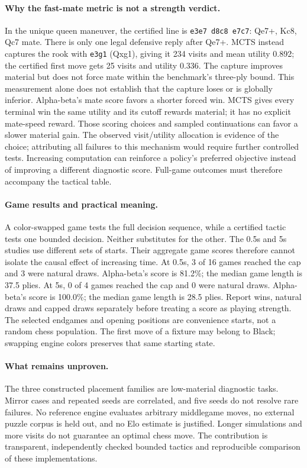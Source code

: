 \paragraph{Why the fast-mate metric is not a strength verdict.}
In the unique queen maneuver, the certified line is \texttt{e3e7 d8c8 e7c7}: Qe7+, Kc8, Qc7 mate. There is only one legal defensive reply after Qe7+.
MCTS instead captures the rook with \texttt{e3g1} (Qxg1), giving it 234 visits and mean utility 0.892; the certified first move gets 25 visits and utility 0.336.
The capture improves material but does not force mate within the benchmark's three-ply bound. This measurement alone does not establish that the capture loses or is globally inferior.
Alpha-beta's mate score favors a shorter forced win. MCTS gives every terminal win the same utility and its cutoff rewards material; it has no explicit mate-speed reward.
Those scoring choices and sampled continuations can favor a slower material gain. The observed visit/utility allocation is evidence of the choice; attributing all failures to this mechanism would require further controlled tests.
Increasing computation can reinforce a policy's preferred objective instead of improving a different diagnostic score. Full-game outcomes must therefore accompany the tactical table.
\paragraph{Game results and practical meaning.}
A color-swapped game tests the full decision sequence, while a certified tactic tests one bounded decision. Neither substitutes for the other.
The 0.5s and 5s studies use different sets of starts. Their aggregate game scores therefore cannot isolate the causal effect of increasing time.
At 0.5s, 3 of 16 games reached the cap and 3 were natural draws. Alpha-beta's score is 81.2\%; the median game length is 37.5 plies.
At 5s, 0 of 4 games reached the cap and 0 were natural draws. Alpha-beta's score is 100.0\%; the median game length is 28.5 plies.
Report wins, natural draws and capped draws separately before treating a score as playing strength.
The selected endgames and opening positions are convenience starts, not a random chess population.
The first move of a fixture may belong to Black; swapping engine colors preserves that same starting state.
\paragraph{What remains unproven.}
The three constructed placement families are low-material diagnostic tasks. Mirror cases and repeated seeds are correlated, and five seeds do not resolve rare failures.
No reference engine evaluates arbitrary middlegame moves, no external puzzle corpus is held out, and no Elo estimate is justified.
Longer simulations and more visits do not guarantee an optimal chess move. The contribution is transparent, independently checked bounded tactics and reproducible comparison of these implementations.
